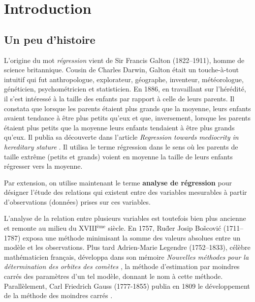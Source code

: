 
\chapter{Introduction}     %
\label{sec:intro}

\section{Un peu d'histoire}

L'origine du mot \textit{régression} vient de Sir Francis Galton (1822--1911), homme de science britannique. Cousin de Charles Darwin, Galton était un touche-à-tout intuitif qui fut anthropologue, explorateur, géographe, inventeur, météorologue, généticien, psychométricien et statisticien.
En 1886, en travaillant sur l'hérédité, il s'est intéressé à la taille des enfants par rapport à celle de leurs parents. Il constata que lorsque les parents étaient plus grands que la moyenne, leurs enfants avaient tendance à être plus petits qu'eux et que, inversement, lorsque les parents étaient plus petits que la moyenne leurs enfants tendaient à être plus grands qu'eux. Il publia sa découverte  dans l'article \emph{Regression towards mediocrity in hereditary stature} \citep{Gal:1886}. Il utilisa le terme régression dans le sens où les parents de taille extrême (petits et grands) voient en moyenne la taille de leurs enfants régresser vers la moyenne.

Par extension, on utilise maintenant le terme \textbf{analyse de régression} pour désigner l'étude des relations qui existent entre des variables mesurables à partir d’observations (données) prises sur ces variables.

L'analyse de la relation entre plusieurs variables est toutefois bien plus ancienne et remonte au milieu du XVIII$^\text{ème}$ siècle. En 1757, Ru\=der Josip Bo\v scovi\'c (1711--1787) exposa une méthode minimisant la somme des valeurs absolues entre un modèle et les observations. Plus tard Adrien-Marie Legendre (1752--1833), célèbre mathématicien français, développa dans son mémoire \emph{Nouvelles méthodes pour la détermination des orbites des comètes} \citep{Leg:1805}, la méthode d'estimation par moindres carrés des paramètres d'un tel modèle, donnant le nom à cette méthode. Parallèlement, Carl Friedrich Gauss (1777-1855) publia en 1809 le développement de la méthode des moindres carrés \citep{Gau:1809}.


